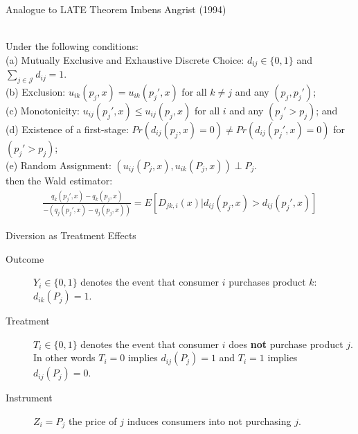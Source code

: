 \documentclass[xcolor=pdftex,dvipsnames,table,mathserif,aspectratio=169]{beamer}
\begin{document}
\begin{frame}{Analogue to LATE Theorem Imbens Angrist (1994)}
\begin{theorem}\ \\
\label{prop:late}
Under the following conditions:\\ 
(a) Mutually Exclusive and Exhaustive Discrete Choice: $d_{ij} \in \{0,1\}$ and $\sum_{j \in \mathcal{J}} d_{ij}=1$.\\
(b) Exclusion: $u_{ik}(p_j,x)=u_{ik}(p_j',x)$ for all $k \neq j$ and any $(p_j, p_j')$; \\
(c) Monotonicity: $u_{ij}(p_j',x) \leq u_{ij}(p_j,x)$ for all $i$ and any $(p_j' > p_{j})$; and \\
(d) Existence of a first-stage: $Pr(d_{ij}(p_j,x)=0) \neq Pr(d_{ij}(p_j',x)=0) $ for $(p_j' > p_{j})$; \\
(e) Random Assignment: $(u_{ij}(P_j,x),u_{ik}(P_j,x)) \perp P_j$. \\
\noindent
then the Wald estimator:
\begin{align*}
 \frac{q_k(p_j',x) - q_k(p_j,x)}{-\left(q_j(p_j',x) - q_j(p_j,x)\right)}=E[D_{jk,i}(x) | d_{ij}(p_j,x) > d_{ij}(p_j',x)]
\end{align*}
\end{theorem}
\end{frame}

\begin{frame}{Diversion as Treatment Effects}
\begin{description}
\item[Outcome] $Y_i \in \{0,1\}$ denotes the event that consumer $i$ purchases product $k$: $d_{ik}(P_j)=1$.
\item[Treatment] $T_i \in \{0,1\}$ denotes the event that consumer $i$ does \textbf{not} purchase product $j$. In other words $T_i = 0$ implies $d_{ij}(P_j)=1$ and $T_i=1$ implies $d_{ij}(P_j)=0$.
\item[Instrument] $Z_i = P_j$ the price of $j$ induces consumers into not purchasing $j$.
\end{description}
\end{frame}
\end{document}
